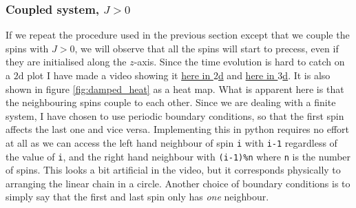 \subsubsection{Coupled system, $J > 0$}

If we repeat the procedure used in the previous section except that we couple the spins with $J > 0$, we will observe that all the spins will start to precess, even if they are initialised along the $z$-axis. Since the time evolution is hard to catch on a $2\mathrm{d}$ plot I have made a video showing it \href{https://folk.ntnu.no/sondrdl/spinwaves/coupled_spins.mp4}{here in $2$d} and \href{https://folk.ntnu.no/sondrdl/spinwaves/coupled_spins_3d.mp4}{here in $3$d}. It is also shown in figure \ref{fig:damped_heat} as a heat map. What is apparent here is that the neighbouring spins couple to each other. Since we are dealing with a finite system, I have chosen to use periodic boundary conditions, so that the first spin affects the last one and vice versa. Implementing this in python requires no effort at all as we can access the left hand neighbour of spin \texttt{i} with \texttt{i-1} regardless of the value of \texttt{i}, and the right hand neighbour with \texttt{(i-1)\%n} where \texttt{n} is the number of spins. This looks a bit artificial in the video, but it corresponds physically to arranging the linear chain in a circle. Another choice of boundary conditions is to simply say that the first and last spin only has \textit{one} neighbour. 


